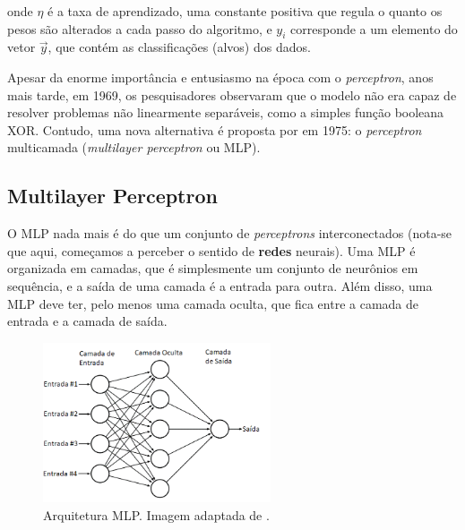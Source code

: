 onde \(\eta\) é a taxa de aprendizado, uma constante positiva que regula o quanto os pesos são alterados a cada passo do algoritmo, e \(y_{i}\) corresponde a um elemento do vetor \(\overrightarrow{y}\), que contém as classificações (alvos) dos dados.

Apesar da enorme importância e entusiasmo na época com o \textit{perceptron}, anos mais tarde, em 1969, os pesquisadores \citeauthor{perceptron_not_linear_separable_marvin_seymour} observaram que o modelo não era capaz de resolver problemas não linearmente separáveis, como a simples função booleana XOR. Contudo, uma nova alternativa é proposta por \citeauthor{mlp_gradient_descend_paul} em 1975: o \textit{perceptron} multicamada (\textit{multilayer perceptron} ou MLP).




\subsection{Multilayer Perceptron}

O \ac{MLP} nada mais é do que um conjunto de \textit{perceptrons} interconectados (nota-se que aqui, começamos a perceber o sentido de \textbf{redes} neurais). Uma \ac{MLP} é organizada em camadas, que é simplesmente um conjunto de neurônios em sequência, e a saída de uma camada é a entrada para outra. Além disso, uma \ac{MLP} deve ter, pelo menos uma camada oculta, que fica entre a camada de entrada e a camada de saída.

\begin{figure}[h] %
  \centering
  \includegraphics[width=0.6\textwidth]{imagens/arquitetura_mlp.png}
  \caption{Arquitetura MLP. Imagem adaptada de \cite{mlp_architeture_hassan}. \cite{tcc_anomalia_2021}}
  \label{fig:arquitetura_mlp}
\end{figure}

